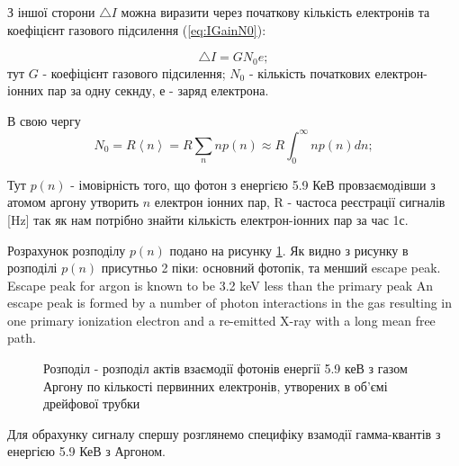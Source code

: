 \documentclass[]{article}
\def\mean#1{\left< #1 \right>}
\begin{document}
	З іншої сторони $\bigtriangleup I$  можна виразити через початкову кількість електронів та коефіцієнт газового підсилення (\ref{eq:IGainN0}):
	
	\begin{equation}
	\bigtriangleup I = G N_0 e;
	\label{eq:IGainN0}
	\end{equation}
	тут $G$ - коефіцієнт газового підсилення; $N_0$ - кількість початкових електрон-іонних пар за одну секнду, е - заряд електрона.
	
	
	В свою чергу
	\begin{equation}
	N_0 = R \mean{n} = R \sum_n n p(n) \approx R \int_0^\infty n p(n) dn;
	\end{equation}
	
	Тут $p(n)$ - імовірність того, що фотон з енергією 5.9 КеВ провзаємодівши з атомом аргону утворить $n$ електрон іонних пар, R - частоса реєстрації сигналів [Hz] так як нам потрібно знайти кількість електрон-іонних пар за час 1с.
	
	Розрахунок розподілу $p(n)$ подано на рисунку \ref{fig:n_probability}. Як видно з рисунку в розподілі $p(n)$ присутньо 2 піки: основний фотопік, та менший escape peak. Escape peak for argon is known to be 3.2 keV less
than the primary peak An escape peak is formed by a number of photon interactions in the gas resulting in one primary ionization electron and a re-emitted X-ray with a long mean free path.
	
	\begin{figure}[!h]
	\caption{ Розподіл - розподіл актів взаємодії фотонів енергії 5.9 кеВ з газом Аргону по кількості первинних електронів, утворених в об’ємі дрейфової трубки}
	\label{fig:n_probability}
	\end{figure}
	
	
	Для обрахунку сигналу спершу розглянемо специфіку взамодії гамма-квантів з енергією 5.9 КеВ з Аргоном. 
	
	 
	
\end{document}
